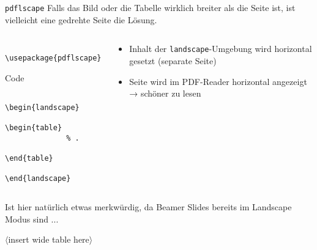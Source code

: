 \begin{frame}[fragile]{\texttt{pdflscape}}
  Falls das Bild oder die Tabelle wirklich breiter als die Seite ist, ist vielleicht eine gedrehte Seite die Lösung.
  \begin{columns}[onlytextwidth, t]
    \begin{column}{0.50\textwidth}
      \begin{Packages}
        \begin{lstlisting}
          \usepackage{pdflscape}
        \end{lstlisting}
      \end{Packages}
      \begin{block}{Code}
        \begin{lstlisting}
          \begin{landscape}
            \begin{table}
              % .
            \end{table}
          \end{landscape}
        \end{lstlisting}
      \end{block}
    \end{column}
    \begin{column}{0.46\textwidth}
      \begin{itemize}
        \item Inhalt der \texttt{landscape}-Umgebung wird horizontal gesetzt (separate Seite)
        \item Seite wird im PDF-Reader horizontal angezeigt → schöner zu lesen
      \end{itemize}
    \end{column}
  \end{columns}
  Ist hier natürlich etwas merkwürdig, da Beamer Slides bereits im Landscape Modus sind ...
\end{frame}

\begin{landscape}
  \begin{frame}
    \centering
    $\langle$insert wide table here$\rangle$
  \end{frame}
\end{landscape}
